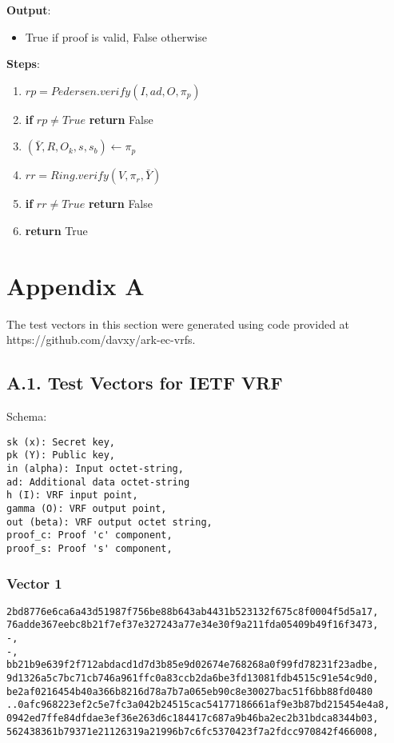 \documentclass[
]{article}
\providecommand{\tightlist}{%
  \setlength{\itemsep}{0pt}\setlength{\parskip}{0pt}}
\begin{document}
\textbf{Output}:

\begin{itemize}
\tightlist
\item
  True if proof is valid, False otherwise
\end{itemize}

\textbf{Steps}:

\begin{enumerate}
\def\labelenumi{\arabic{enumi}.}
\tightlist
\item
  \(rp = Pedersen.verify(I, ad, O, \pi_p)\)
\item
  \textbf{if} \(rp \neq True\) \textbf{return} False
\item
  \((\bar{Y}, R, O_k, s, s_b) \leftarrow \pi_p\)
\item
  \(rr = Ring.verify(V, \pi_r, \bar{Y})\)
\item
  \textbf{if} \(rr \neq True\) \textbf{return} False
\item
  \textbf{return} True
\end{enumerate}

\hypertarget{appendix-a}{%
\section{Appendix A}\label{appendix-a}}

The test vectors in this section were generated using code provided at
https://github.com/davxy/ark-ec-vrfs.

\hypertarget{a.1.-test-vectors-for-ietf-vrf}{%
\subsection{A.1. Test Vectors for IETF
VRF}\label{a.1.-test-vectors-for-ietf-vrf}}

Schema:

\begin{verbatim}
sk (x): Secret key,
pk (Y): Public key,
in (alpha): Input octet-string,
ad: Additional data octet-string
h (I): VRF input point,
gamma (O): VRF output point,
out (beta): VRF output octet string,
proof_c: Proof 'c' component,
proof_s: Proof 's' component,
\end{verbatim}

\hypertarget{vector-1}{%
\subsubsection{Vector 1}\label{vector-1}}

\begin{verbatim}
2bd8776e6ca6a43d51987f756be88b643ab4431b523132f675c8f0004f5d5a17,
76adde367eebc8b21f7ef37e327243a77e34e30f9a211fda05409b49f16f3473,
-,
-,
bb21b9e639f2f712abdacd1d7d3b85e9d02674e768268a0f99fd78231f23adbe,
9d1326a5c7bc71cb746a961ffc0a83ccb2da6be3fd13081fdb4515c91e54c9d0,
be2af0216454b40a366b8216d78a7b7a065eb90c8e30027bac51f6bb88fd0480
..0afc968223ef2c5e7fc3a042b24515cac54177186661af9e3b87bd215454e4a8,
0942ed7ffe84dfdae3ef36e263d6c184417c687a9b46ba2ec2b31bdca8344b03,
562438361b79371e21126319a21996b7c6fc5370423f7a2fdcc970842f466008,
\end{verbatim}
\end{document}
